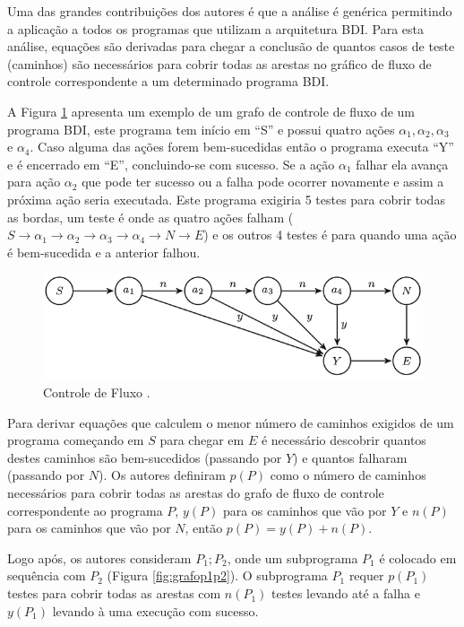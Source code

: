 Uma das grandes contribuições dos autores é que a  análise é genérica permitindo a aplicação a todos os programas que utilizam a arquitetura BDI. Para esta análise, equações são derivadas  para chegar a conclusão de quantos casos de teste (caminhos) são necessários para cobrir todas as arestas no gráfico de fluxo de controle correspondente a um determinado programa BDI.

A Figura \ref{fig:control_fluxo} apresenta um exemplo de um grafo de controle de fluxo de um programa BDI, este programa tem início em “S” e possui quatro ações $\alpha_{1}, \alpha_{2}, \alpha_{3}$ e $\alpha_{4}$. Caso alguma das ações forem bem-sucedidas então o programa executa “Y” e é encerrado em “E”, concluindo-se com sucesso. Se a ação $\alpha_{1}$ falhar ela avança para ação $\alpha_{2}$ que pode ter sucesso ou a falha pode ocorrer novamente e assim a próxima ação seria executada. Este programa exigiria 5 testes para cobrir todas as bordas, um teste é onde as quatro ações falham ($S \rightarrow \alpha_{1} \rightarrow \alpha_{2} \rightarrow \alpha_{3} \rightarrow \alpha_{4} \rightarrow N \rightarrow E$) e os outros 4 testes é para quando uma ação é bem-sucedida e a anterior falhou.

\begin{figure}[ht]
\centering
\includegraphics[scale=0.5]{imagens/control_flow.png}
\caption{Controle de Fluxo \cite{winikoff2017bdi}.}
\label{fig:control_fluxo}
\end{figure}

Para derivar equações que calculem o menor número de caminhos exigidos de um programa começando em $S$ para chegar em $E$ é necessário descobrir quantos destes caminhos são bem-sucedidos (passando por $Y$) e quantos falharam (passando por $N$). Os autores definiram $p(P)$ como o número de caminhos necessários para cobrir todas as arestas do grafo de fluxo de controle correspondente ao programa $P$, $y(P)$ para os caminhos que vão por $Y$ e $n(P)$ para os caminhos que vão por $N$, então $p(P) = y(P) + n(P)$.

Logo após, os autores consideram $P_{1};P_{2}$, onde um subprograma $P_{1}$ é colocado em sequência com $P_{2}$ (Figura \ref{fig:grafop1p2}). O subprograma $P_{1}$ requer $p(P_{1})$ testes para cobrir todas as arestas com $n(P_{1})$ testes levando até a falha e $y(P_{1})$ levando à uma execução com sucesso.

